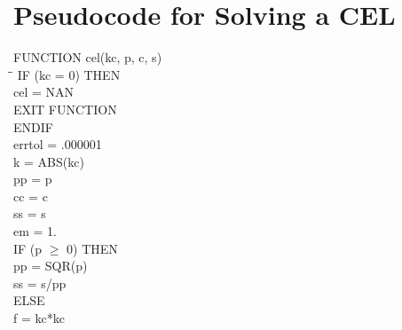 
\lhead[\chaptername~\thechapter]{\rightmark}


\rhead[\leftmark]{}


\lfoot[\thepage]{}


\cfoot{}


\rfoot[]{\thepage}


\chapter{Pseudocode for Solving a \ac{CEL}}
\begin{tabbing}
FUNCTION cel(kc, p, c, s) \\
\hspace*{1cm}\=\hspace*{1cm}\= \kill
\> IF (kc = 0) THEN \\
\> \> cel = NAN \\
\> \> EXIT FUNCTION\\
\> ENDIF\\
\> errtol = .000001\\
\> k = ABS(kc)\\
\> pp = p\\
\> cc = c\\
\> ss = s\\
\> em = 1.\\
\> IF (p $ \geq $ 0) THEN\\
\> \> pp = SQR(p)\\
\> \> ss = s/pp \\
\> ELSE\\
\> \> f = kc*kc\\

\end{tabbing}






